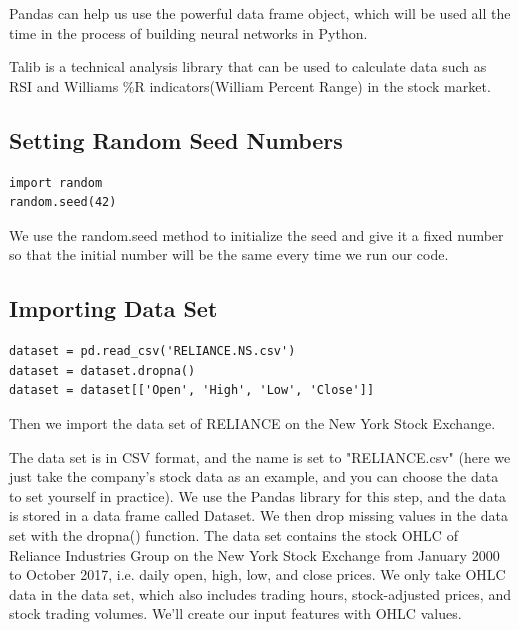 \documentclass{article}
\begin{document}
Pandas can help us use the powerful data frame object, which will be used all the time in the process of building neural networks in Python.

Talib is a technical analysis library that can be used to calculate data such as RSI and Williams \%R indicators(William Percent Range) in the stock market.

\subsection{Setting Random Seed Numbers}
\begin{verbatim}
import random
random.seed(42)
\end{verbatim}
We use the random.seed method to initialize the seed and give it a fixed number so that the initial number will be the same every time we run our code.

\subsection{Importing Data Set}
\begin{verbatim}
dataset = pd.read_csv('RELIANCE.NS.csv')
dataset = dataset.dropna()
dataset = dataset[['Open', 'High', 'Low', 'Close']]
\end{verbatim}
Then we import the data set of RELIANCE on the New York Stock Exchange.

The data set is in CSV format, and the name is set to "RELIANCE.csv" (here we just take the company's stock data as an example, and you can choose the data to set yourself in practice). We use the Pandas library for this step, and the data is stored in a data frame called Dataset. We then drop missing values in the data set with the dropna() function. The data set contains the stock OHLC of Reliance Industries Group on the New York Stock Exchange from January 2000 to October 2017, i.e. daily open, high, low, and close prices. We only take OHLC data in the data set, which also includes trading hours, stock-adjusted prices, and stock trading volumes. We'll create our input features with OHLC values.
\end{document}

